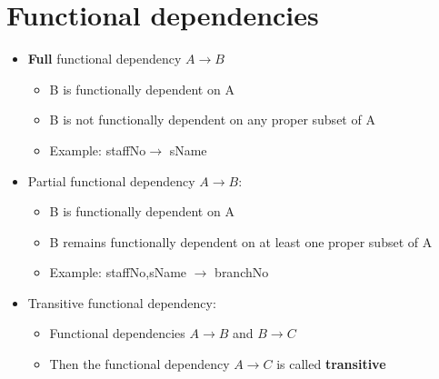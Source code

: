 \documentclass{article}[18pt]
\begin{document}
\section{Functional dependencies}
\begin{itemize}
	\item \textbf{Full} functional dependency $A\rightarrow B$
	\begin{itemize}
		\item B is functionally dependent on A
		\item B is not functionally dependent on any proper subset of A
		\item Example: staffNo$\rightarrow$ sName
	\end{itemize}
	\item Partial functional dependency $A\rightarrow B$:
	\begin{itemize}
		\item B is functionally dependent on A
		\item B remains functionally dependent on at least one proper subset of A
		\item Example: staffNo,sName $\rightarrow$ branchNo
	\end{itemize}
	\item Transitive functional dependency:
	\begin{itemize}
		\item Functional dependencies $A\rightarrow B$ and $B\rightarrow C$
		\item Then the functional dependency $A\rightarrow C$ is called \textbf{transitive}
	\end{itemize}
\end{itemize}
\end{document}
